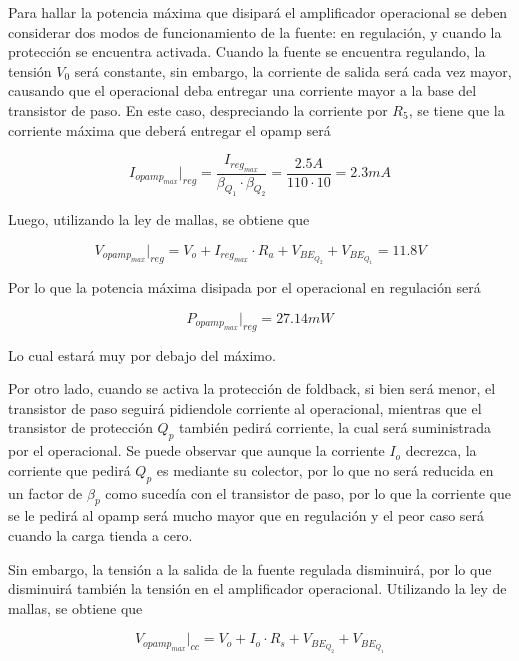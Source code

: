 Para hallar la potencia máxima que disipará el amplificador operacional se deben considerar dos modos de funcionamiento de la fuente: en regulación, y cuando la protección se encuentra activada. Cuando la fuente se encuentra regulando, la tensión $V_0$ será constante, sin embargo, la corriente de salida será cada vez mayor, causando que el operacional deba entregar una corriente mayor a la base del transistor de paso. En este caso, despreciando la corriente por $R_5$, se tiene que la corriente máxima que deberá entregar el opamp será

\begin{equation}
I_{opamp_{max}}|_{reg} = \frac{I_{reg_{max}}}{\beta _{Q_{1}} \cdot \beta _{Q_{2}}} = \frac{2.5A}{110 \cdot 10} = 2.3mA
\end{equation}

Luego, utilizando la ley de mallas, se obtiene que

\begin{equation}
V_{opamp_{max}}|_{reg} = V_o + I_{reg_{max}} \cdot R_a + V_{BE_{Q_2}} + V_{BE_{Q_1}} = 11.8V
\end{equation}

Por lo que la potencia máxima disipada por el operacional en regulación será

\begin{equation}
P_{opamp_{max}}|_{reg} = 27.14mW
\end{equation}

Lo cual estará muy por debajo del máximo.

Por otro lado, cuando se activa la protección de foldback, si bien será menor, el transistor de paso seguirá pidiendole corriente al operacional, mientras que el transistor de protección $Q_p$ también pedirá corriente, la cual será suministrada por el operacional. Se puede observar que aunque la corriente $I_o$ decrezca, la corriente que pedirá $Q_p$ es mediante su colector, por lo que no será reducida en un factor de $\beta_p$ como sucedía con el transistor de paso, por lo que la corriente que se le pedirá al opamp será mucho mayor que en regulación y el peor caso será cuando la carga tienda a cero.

Sin embargo, la tensión a la salida de la fuente regulada disminuirá, por lo que disminuirá también la tensión en el amplificador operacional. Utilizando la ley de mallas, se obtiene que

\begin{equation}
V_{opamp_{max}}|_{cc} = V_{o} + I_{o}\cdot R_s + V_{BE_{Q_2}} + V_{BE_{Q_1}}
\end{equation}

